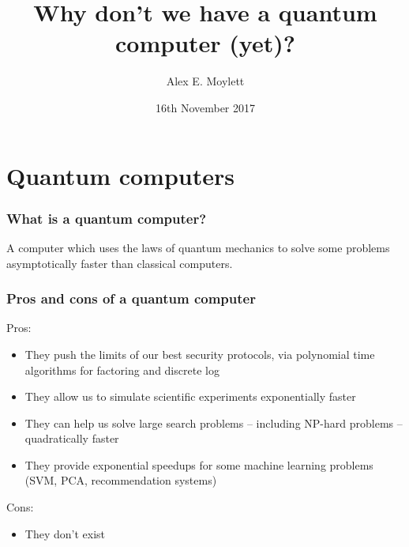 \documentclass[]{beamer}
\title[Why don't we have a quantum computer?]{Why don't we have a quantum computer (yet)?} %
\author[Alex E. Moylett]{Alex E. Moylett} %
\institute[University of Bristol] %
{
Quantum Engineering Technology Labs and Quantum Engineering Centre for Doctoral Training\\
University of Bristol \\ %
\medskip
\textit{\href{mailto:alex.moylett@bristol.ac.uk}{alex.moylett@bristol.ac.uk}} %
}
\date{16th November 2017} %
\begin{document}
\begin{frame}
\titlepage %
\end{frame}


\section{Quantum computers}

\begin{frame}
\frametitle{What is a quantum computer?}
A computer which uses the laws of quantum mechanics to solve some problems asymptotically faster than classical computers.
\end{frame}

\begin{frame}
\frametitle{Pros and cons of a quantum computer}

Pros:
\begin{itemize}
\item<2-> They push the limits of our best security protocols, via polynomial time algorithms for factoring and discrete log
\item<3-> They allow us to simulate scientific experiments exponentially faster
\item<4-> They can help us solve large search problems -- including NP-hard problems -- quadratically faster
\item<5-> They provide exponential speedups for some machine learning problems (SVM, PCA, recommendation systems)
\end{itemize}

Cons:
\begin{itemize}
\item<6-> They don't exist
\end{itemize}
\end{frame}
\end{document}
